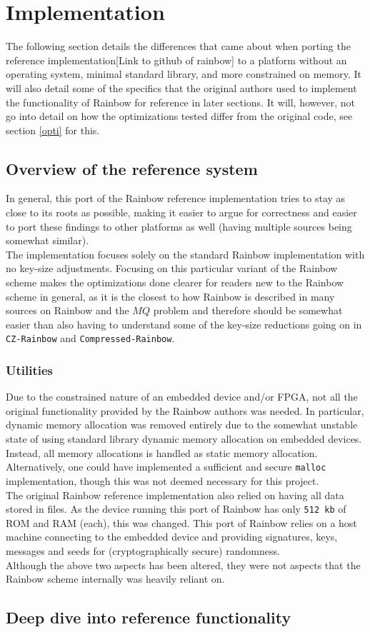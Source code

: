 \section{Implementation}
The following section details the differences that came about when porting the reference implementation[Link to github of rainbow] to a platform without an operating system, minimal standard library, and more constrained on memory. It will also detail some of the specifics that the original authors used to implement the functionality of Rainbow for reference in later sections. It will, however, not go into detail on how the optimizations tested differ from the original code, see section \ref{opti} for this.
\subsection{Overview of the reference system}
In general, this port of the Rainbow reference implementation tries to stay as close to its roots as possible, making it easier to argue for correctness and easier to port these findings to other platforms as well (having multiple sources being somewhat similar).\medskip\\
The implementation focuses solely on the standard Rainbow implementation with no key-size adjustments. Focusing on this particular variant of the Rainbow scheme makes the optimizations done clearer for readers new to the Rainbow scheme in general, as it is the closest to how Rainbow is described in many sources on Rainbow and the $MQ$ problem and therefore should be somewhat easier than also having to understand some of the key-size reductions going on in \texttt{CZ-Rainbow} and \texttt{Compressed-Rainbow}.

\subsubsection{Utilities}
Due to the constrained nature of an embedded device and/or FPGA, not all the original functionality provided by the Rainbow authors was needed. In particular, dynamic memory allocation was removed entirely due to the somewhat unstable state of using standard library dynamic memory allocation on embedded devices. Instead, all memory allocations is handled as static memory allocation. Alternatively, one could have implemented a sufficient and secure \texttt{malloc} implementation, though this was not deemed necessary for this project.\medskip\\
The original Rainbow reference implementation also relied on having all data stored in files. As the device running this port of Rainbow has only \texttt{512 kb} of ROM and RAM (each), this was changed. This port of Rainbow relies on a host machine connecting to the embedded device and providing signatures, keys, messages and seeds for (cryptographically secure) randomness.\medskip\\
Although the above two aspects has been altered, they were not aspects that the Rainbow scheme internally was heavily reliant on. 
\subsection{Deep dive into reference functionality}